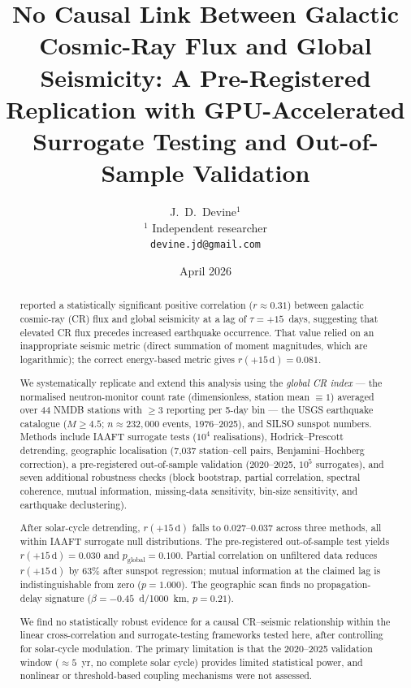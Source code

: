 \documentclass[12pt,a4paper]{article}
\title{\textbf{No Causal Link Between Galactic Cosmic-Ray Flux and Global
Seismicity: A Pre-Registered Replication with GPU-Accelerated Surrogate Testing
and Out-of-Sample Validation}}
\author{
  J.~D.~Devine$^{1}$\\[4pt]
  {\small $^{1}$ Independent researcher}\\
  {\small \texttt{devine.jd@gmail.com}}
}
\date{April 2026}
\begin{document}
\maketitle
\linenumbers

\begin{abstract}
\noindent
\citet{Homola2023} reported a statistically significant positive correlation
($r \approx 0.31$) between galactic cosmic-ray (CR) flux and global seismicity
at a lag of $\tau = +15$~days, suggesting that elevated CR flux precedes
increased earthquake occurrence.
That value relied on an inappropriate seismic metric (direct summation of
moment magnitudes, which are logarithmic); the correct energy-based metric
\citep{Kanamori1977} gives $r(+15\,\text{d}) = 0.081$.

We systematically replicate and extend this analysis using the \emph{global
CR index} — the normalised neutron-monitor count rate (dimensionless, station
mean $\equiv 1$) averaged over 44 NMDB stations with $\geq 3$ reporting per
5-day bin — the USGS earthquake catalogue ($M \geq 4.5$; $n \approx 232{,}000$
events, 1976--2025), and SILSO sunspot numbers.
Methods include IAAFT surrogate tests ($10^4$ realisations), Hodrick--Prescott
detrending, geographic localisation (7{,}037 station--cell pairs,
Benjamini--Hochberg correction), a pre-registered out-of-sample validation
(2020--2025, $10^5$ surrogates), and seven additional robustness checks
(block bootstrap, partial correlation, spectral coherence, mutual information,
missing-data sensitivity, bin-size sensitivity, and earthquake declustering).

After solar-cycle detrending, $r(+15\,\text{d})$ falls to 0.027--0.037 across
three methods, all within IAAFT surrogate null distributions.
The pre-registered out-of-sample test yields $r(+15\,\text{d}) = 0.030$ and
$p_\text{global} = 0.100$.
Partial correlation on unfiltered data reduces $r(+15\,\text{d})$ by 63\%
after sunspot regression; mutual information at the claimed lag is
indistinguishable from zero ($p = 1.000$).
The geographic scan finds no propagation-delay signature
($\beta = -0.45$~d/1000~km, $p = 0.21$).

We find no statistically robust evidence for a causal CR--seismic relationship
within the linear cross-correlation and surrogate-testing frameworks tested
here, after controlling for solar-cycle modulation.
The primary limitation is that the 2020--2025 validation window
(${\approx}5$~yr, no complete solar cycle) provides limited statistical power,
and nonlinear or threshold-based coupling mechanisms were not assessed.
\end{abstract}
\end{document}

